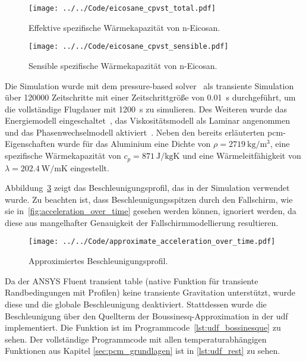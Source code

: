 \begin{figure}[H]
  \centering
  \texttt{[image: ../../Code/eicosane\_cpvst\_total.pdf]}
  \caption{Effektive spezifische Wärmekapazität von n-Eicosan.}\label{fig:pcm_effective_cp}
\end{figure}

\begin{figure}[H]
  \centering
  \texttt{[image: ../../Code/eicosane\_cpvst\_sensible.pdf]}
  \caption{Sensible spezifische Wärmekapazität von n-Eicosan.}\label{fig:pcm_sensible_cp}
\end{figure}

Die Simulation wurde mit dem pressure-based solver~\cite{akamcae-udf} als transiente Simulation über 120000 Zeitschritte mit einer Zeitschrittgröße von \SI{0,01}{\second} durchgeführt,
um die vollständige Flugdauer mit \SI{1200}{\second} zu simulieren.
Des Weiteren wurde das Energiemodell eingeschaltet~\cite{akamcae-udf}, das Viskositätsmodell als Laminar angenommen~\cite{akamcae-udf} und das Phasenwechselmodell aktiviert~\cite{akamcae-udf}.
Neben den bereits erläuterten \ac{pcm}-Eigenschaften wurde für das Aluminium eine Dichte von $\rho = \SI{2719}{\kilogram\per\meter\cubed}$,
eine spezifische Wärmekapazität von $c_p = \SI{871}{\joule\per\kilogram\kelvin}$ und eine Wärmeleitfähigkeit von $\lambda = \SI{202,4}{\watt\per\meter\kelvin}$
eingestellt.

Abbildung~\ref{fig:approximierte_beschleunigung} zeigt das Beschleunigungsprofil, das in der Simulation verwendet wurde. Zu beachten
ist, dass Beschleunigungsspitzen durch den Fallschirm, wie sie in~\ref{fig:acceleration_over_time} gesehen
werden können, ignoriert werden, da diese aus mangelhafter Genauigkeit der Fallschirmmodellierung resultieren.

\begin{figure}
  \centering
  \texttt{[image: ../../Code/approximate\_acceleration\_over\_time.pdf]}
  \caption{Approximiertes Beschleunigungsprofil.}\label{fig:approximierte_beschleunigung}
\end{figure}

Da der ANSYS Fluent transient table (native Funktion für transiente Randbedingungen mit Profilen) keine transiente Gravitation
unterstützt, wurde diese und die globale Beschleunigung deaktiviert.
Stattdessen wurde die Beschleunigung über den Quellterm der Boussinesq-Approximation in der \ac{udf} implementiert. Die Funktion ist im
Programmcode~\ref{lst:udf_bossinesque} zu sehen. Der vollständige Programmcode mit allen temperaturabhängigen Funktionen aus Kapitel \ref{sec:pcm_grundlagen} ist in \ref{lst:udf_rest} zu sehen.

